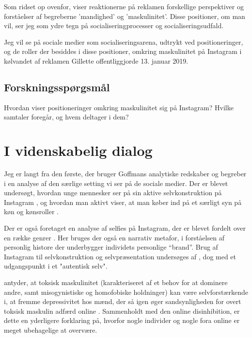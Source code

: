 Som ridset op ovenfor, viser reaktionerne på reklamen forskellige
perspektiver og forståelser af begreberne 'mandighed' og
'maskulinitet'. Disse positioner, om man vil, ser jeg som ydre
tegn på socialiseringprocesser og socialiseringsudfald. 

Jeg vil se på sociale medier som socialiseringsarena, udtrykt ved
positioneringer, og  de roller der besiddes i disse positioner, 
omkring maskulinitet på Instagram i kølvandet af
reklamen Gillette offentliggjorde 13. januar 2019. 

\subsection{Forskningsspørgsmål}
Hvordan viser positioneringer omkring maskulinitet sig på 
Instagram? Hvilke samtaler foregår, og hvem deltager i dem?

\section{I videnskabelig dialog}

Jeg er langt fra den første, der bruger Goffmans analytiske 
redskaber og begreber i en analyse af den særlige setting vi ser 
på de sociale medier. Der er blevet undersøgt, hvordan unge 
mennesker ser på sin aktive selvkonstruktion på Instagram 
\autocite{seehaferNOFILTERExplorationInstagram2017a}, og hvordan 
man aktivt viser, at man køber ind på et særligt syn på køn og 
kønsroller \autocite{bakerGoodMorningFitfam2018}. 

Der er også foretaget en analyse af selfies på Instagram, der er 
blevet fordelt over en række genrer 
\autocite{eagarClassifyingNarratedSelfie2016}. Her bruges der også 
en narrativ metafor, i forståelsen af personlig histore der 
underbygger individets personlige “brand”. Brug
af Instagram til selvkonstruktion og selvpræsentation undersøges 
af \citeauthor{lazebnaRoleCommunicationApprehension2015}, dog med 
et udgangspunkt i et "autentisk selv".

\citeauthor{parentSocialMediaBehavior2018} antyder, at toksisk 
maskulinitet (karakteriseret af et behov for at dominere andre, 
samt misogynistiske og homofobiske holdninger) kan være 
selvforstærkende i, at fremme depressivitet hos mænd, der så igen 
øger sandsynligheden for overt toksisk maskulin adfærd online 
\autocite{parentSocialMediaBehavior2018}. Sammenholdt med den 
online disinhibition, er dette en yderligere forklaring på, 
hvorfor nogle individer og nogle fora online er meget ubehagelige 
at overvære.

